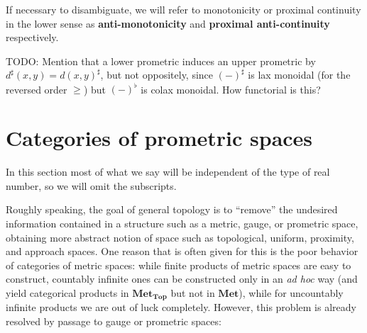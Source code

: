 \documentclass{article}
\def\upp#1{{#1}^{\sharp}}
\def\low#1{{#1}^{\flat}}
\def\Met{\mathbf{Met}}
\def\MetTop{\mathbf{Met}_{\mathbf{Top}}}
\begin{document}
If necessary to disambiguate, we will refer to monotonicity or proximal continuity in the lower sense as \textbf{anti-monotonicity} and \textbf{proximal anti-continuity} respectively.

TODO: Mention that a lower prometric induces an upper prometric by $\upp{d}(x,y) = \upp{d(x,y)}$, but not oppositely, since $\upp{(-)}$ is lax monoidal (for the reversed order $\ge$) but $\low{(-)}$ is colax monoidal.
How functorial is this?


\section{Categories of prometric spaces}
\label{sec:sub-promet}

In this section most of what we say will be independent of the type of real number, so we will omit the subscripts.

Roughly speaking, the goal of general topology is to ``remove'' the undesired information contained in a structure such as a metric, gauge, or prometric space, obtaining more abstract notion of space such as topological, uniform, proximity, and approach spaces.
One reason that is often given for this is the poor behavior of categories of metric spaces: while finite products of metric spaces are easy to construct, countably infinite ones can be constructed only in an \textit{ad hoc} way (and yield categorical products in $\MetTop$ but not in $\Met$), while for uncountably infinite products we are out of luck completely.
However, this problem is already resolved by passage to gauge or prometric spaces:
\end{document}
